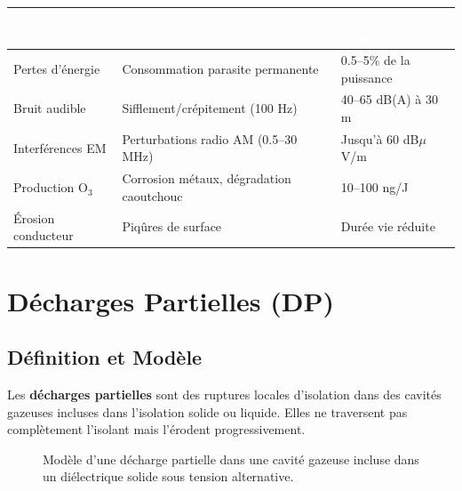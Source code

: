 \documentclass[12pt, a4paper, twoside]{report}
\begin{document}
\begin{center}
\begin{tabularx}{\textwidth}{lXl}
\toprule
\rowcolor{darkblue}
\textcolor{white}{\textbf{Effet}} &
\textcolor{white}{\textbf{Description}} &
\textcolor{white}{\textbf{Ordre de grandeur}} \\
\midrule
Pertes d'énergie & Consommation parasite permanente & 0.5--5\% de la puissance \\
\rowcolor{lightgray}
Bruit audible & Sifflement/crépitement (100 Hz) & 40--65 dB(A) à 30 m \\
Interférences EM & Perturbations radio AM (0.5--30 MHz) & Jusqu'à 60 dB$\mu$V/m \\
\rowcolor{lightgray}
Production O$_3$ & Corrosion métaux, dégradation caoutchouc & 10--100 ng/J \\
Érosion conducteur & Piqûres de surface & Durée vie réduite \\
\bottomrule
\end{tabularx}
\end{center}

\section{Décharges Partielles (DP)}

\subsection{Définition et Modèle}

Les \textbf{décharges partielles} sont des ruptures locales d'isolation dans des
cavités gazeuses incluses dans l'isolation solide ou liquide. Elles ne traversent
pas complètement l'isolant mais l'érodent progressivement.

\begin{figure}[H]
\centering
{}
\caption{Modèle d'une décharge partielle dans une cavité gazeuse incluse
dans un diélectrique solide sous tension alternative.}
\end{figure}
\end{document}
